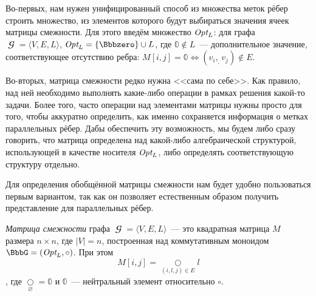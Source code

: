 Во-первых, нам нужен унифицированный способ из множества меток рёбер строить множество, из элементов которого будут выбираться значения ячеек матрицы смежности.
Для этого введём множество $\textit{Opt}_{L}$: для графа $\mbfscrG = \langle V, E, L \rangle$, $\Opt{L}=\{\Bbbzero\} \cup L$, где $\Bbbzero \notin L$~--- дополнительное значение, соответствующее отсутствию ребра: $M[i,j] = \Bbbzero \iff (v_i, _ ,v_j) \notin E$.

Во-вторых, матрица смежности редко нужна <<сама по себе>>.
Как правило, над ней необходимо выполнять какие-либо операции в рамках решения какой-то задачи.
Более того, часто операции над элементами матрицы нужны просто для того, чтобы аккуратно определить, как именно сохраняется информация о метках параллельных рёбер.
Дабы обеспечить эту возможность, мы будем либо сразу говорить, что матрица определена над какой-либо алгебраической структурой, использующей в качестве носителя $\textit{Opt}_{L}$, либо определять соответствующую структуру отдельно.

Для определения обобщённой матрицы смежности нам будет удобно пользоваться первым вариантом, так как он позволяет естественным образом получить представление для параллельных рёбер.

\begin{definition}
    \emph{Матрица смежности} графа $\mbfscrG = \langle V, E, L \rangle$~--- это квадратная матрица $M$ размера $n \times n$, где $|V| = n$, построенная над коммутативным моноидом $\BbbG = (\Opt{L}, \circ)$.
    При этом \[M[i,j] = \underset{{(i, l, j) \in E}}{\bigcirc} l\], где $\underset{\varnothing}{\bigcirc} = \Bbbzero$ и $\Bbbzero$~--- нейтральный элемент относительно $\circ$.
\end{definition}

